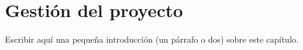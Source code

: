 \chapter{Gestión del proyecto}
\label{chap:06mgmnt}

Escribir aquí una pequeña introducción (un párrafo o dos) sobre este capítulo.
